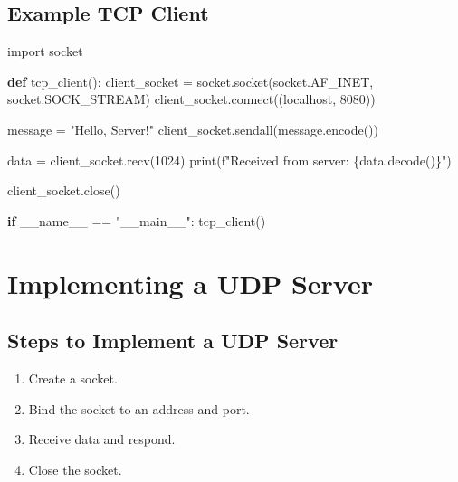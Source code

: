 \documentclass[
  letterpaper,
  DIV=11,
  numbers=noendperiod]{scrreprt}
\newenvironment{Shaded}{\begin{snugshade}}{\end{snugshade}}
\newcommand{\BuiltInTok}[1]{\textcolor[rgb]{0.00,0.23,0.31}{#1}}
\newcommand{\ControlFlowTok}[1]{\textcolor[rgb]{0.00,0.23,0.31}{\textbf{#1}}}
\newcommand{\DecValTok}[1]{\textcolor[rgb]{0.68,0.00,0.00}{#1}}
\newcommand{\ExtensionTok}[1]{\textcolor[rgb]{0.00,0.23,0.31}{#1}}
\newcommand{\ImportTok}[1]{\textcolor[rgb]{0.00,0.46,0.62}{#1}}
\newcommand{\KeywordTok}[1]{\textcolor[rgb]{0.00,0.23,0.31}{\textbf{#1}}}
\newcommand{\NormalTok}[1]{\textcolor[rgb]{0.00,0.23,0.31}{#1}}
\newcommand{\OperatorTok}[1]{\textcolor[rgb]{0.37,0.37,0.37}{#1}}
\newcommand{\SpecialCharTok}[1]{\textcolor[rgb]{0.37,0.37,0.37}{#1}}
\newcommand{\SpecialStringTok}[1]{\textcolor[rgb]{0.13,0.47,0.30}{#1}}
\newcommand{\StringTok}[1]{\textcolor[rgb]{0.13,0.47,0.30}{#1}}
\newcommand{\VariableTok}[1]{\textcolor[rgb]{0.07,0.07,0.07}{#1}}
\providecommand{\tightlist}{%
  \setlength{\itemsep}{0pt}\setlength{\parskip}{0pt}}\usepackage{longtable,booktabs,array}
\begin{document}
\subsection{Example TCP Client}\label{example-tcp-client-1}

\begin{Shaded}
\begin{Highlighting}[]
\ImportTok{import}\NormalTok{ socket}

\KeywordTok{def}\NormalTok{ tcp\_client():}
\NormalTok{    client\_socket }\OperatorTok{=}\NormalTok{ socket.socket(socket.AF\_INET, socket.SOCK\_STREAM)}
\NormalTok{    client\_socket.}\ExtensionTok{connect}\NormalTok{((}\StringTok{\textquotesingle{}localhost\textquotesingle{}}\NormalTok{, }\DecValTok{8080}\NormalTok{))}

\NormalTok{    message }\OperatorTok{=} \StringTok{"Hello, Server!"}
\NormalTok{    client\_socket.sendall(message.encode())}

\NormalTok{    data }\OperatorTok{=}\NormalTok{ client\_socket.recv(}\DecValTok{1024}\NormalTok{)}
    \BuiltInTok{print}\NormalTok{(}\SpecialStringTok{f"Received from server: }\SpecialCharTok{\{}\NormalTok{data}\SpecialCharTok{.}\NormalTok{decode()}\SpecialCharTok{\}}\SpecialStringTok{"}\NormalTok{)}

\NormalTok{    client\_socket.close()}

\ControlFlowTok{if} \VariableTok{\_\_name\_\_} \OperatorTok{==} \StringTok{"\_\_main\_\_"}\NormalTok{:}
\NormalTok{    tcp\_client()}
\end{Highlighting}
\end{Shaded}

\section{Implementing a UDP Server}\label{implementing-a-udp-server}

\subsection{Steps to Implement a UDP
Server}\label{steps-to-implement-a-udp-server}

\begin{enumerate}
\def\labelenumi{\arabic{enumi}.}
\tightlist
\item
  Create a socket.
\item
  Bind the socket to an address and port.
\item
  Receive data and respond.
\item
  Close the socket.
\end{enumerate}
\end{document}
